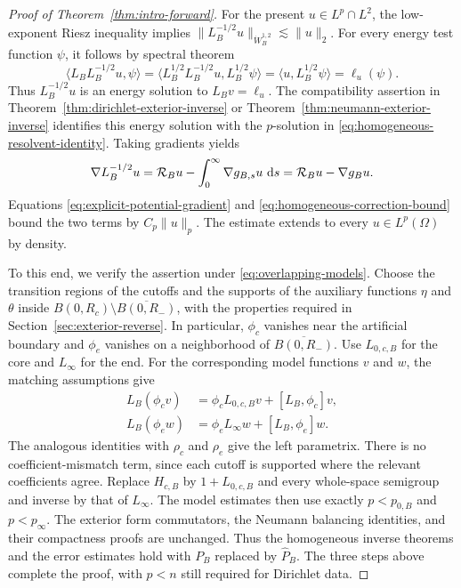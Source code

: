 \documentclass[12pt]{amsart}
\newcommand\dd{\,{\rm d}}
\theoremstyle{remark}
\begin{document}
\begin{proof}[Proof of Theorem~\ref{thm:intro-forward}]
For the present \(u\in L^p\cap L^2\), the low-exponent Riesz inequality implies $\|L_B^{-1/2}u\|_{\dot W_B^{1,2}}\lesssim \|u\|_2$. For every energy test function \(\psi\), it follows by spectral theorem 
\[
 \langle L_BL_B^{-1/2}u,\psi\rangle
 =\langle L_B^{1/2}L_B^{-1/2}u,L_B^{1/2}\psi\rangle
 =\langle u,L_B^{1/2}\psi\rangle
 =\ell_u(\psi).
\]
Thus $L_B^{-1/2}u$ is an energy solution to $L_B v = \ell_u$. The compatibility assertion in
Theorem~\ref{thm:dirichlet-exterior-inverse} or
Theorem~\ref{thm:neumann-exterior-inverse} identifies
this energy solution with the \(p\)-solution in
\eqref{eq:homogeneous-resolvent-identity}.  Taking gradients yields
\[
 \nabla L_B^{-1/2}u
 =\mathcal R_Bu-\int_0^\infty\nabla g_{B,s}u\,\dd s
 =\mathcal R_Bu-\nabla g_Bu.
\]
Equations \eqref{eq:explicit-potential-gradient} and
\eqref{eq:homogeneous-correction-bound} bound the two terms by
\(C_p\|u\|_p\).  The estimate extends to every \(u\in L^p(\Omega)\) by
density.

To this end, we verify the assertion under \eqref{eq:overlapping-models}.
Choose the transition regions of the cutoffs and the supports of the
auxiliary functions $\eta$ and $\theta$ inside
$B(0,R_c)\setminus\overline{B(0,R_-)}$, with the properties required
in Section~\ref{sec:exterior-reverse}.  In particular, $\phi_c$ vanishes
near the artificial boundary and $\phi_e$ vanishes on a neighborhood of
$\overline{B(0,R_-)}$.  Use $L_{0,c,B}$ for the core and $L_\infty$
for the end.  For the corresponding model functions $v$ and $w$, the
matching assumptions give 
\[
 \begin{aligned}
 L_B(\phi_cv)&=\phi_cL_{0,c,B}v+[L_B,\phi_c]v,\\
 L_B(\phi_ew)&=\phi_eL_\infty w+[L_B,\phi_e]w.
 \end{aligned}
\]
The analogous identities with $\rho_c$ and $\rho_e$ give the left
parametrix.  There is no coefficient-mismatch term, since each cutoff
is supported where the relevant coefficients agree.  Replace
$H_{c,B}$ by $1+L_{0,c,B}$ and every whole-space semigroup and inverse
by that of $L_\infty$.  The model estimates then use exactly
$p<p_{0,B}$ and $p<p_\infty$.  The exterior form commutators, the
Neumann balancing identities, and their compactness proofs are
unchanged.  Thus the homogeneous inverse theorems and the error
estimates hold with $P_B$ replaced by $\widehat P_B$.  The three steps
above complete the proof, with $p<n$ still required for Dirichlet data.
\end{proof}
\end{document}
